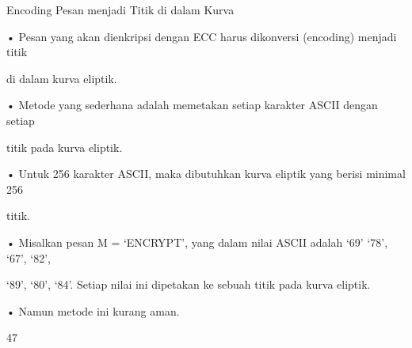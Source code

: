 \documentclass{article}
\begin{document}

Encoding Pesan menjadi Titik di dalam Kurva

• Pesan yang akan dienkripsi dengan ECC harus dikonversi (encoding) menjadi titik 

di dalam kurva eliptik.

• Metode yang sederhana adalah memetakan setiap karakter ASCII dengan setiap 

titik pada kurva eliptik.

• Untuk 256 karakter ASCII, maka dibutuhkan kurva eliptik yang berisi minimal 256 

titik.

• Misalkan pesan M  = ‘ENCRYPT’, yang dalam nilai ASCII adalah ‘69’ ‘78’, ‘67’, ‘82’, 

‘89’, ‘80’, ‘84’. Setiap nilai ini dipetakan ke sebuah titik pada kurva eliptik.

• Namun metode ini kurang aman.

47
\end{document}
